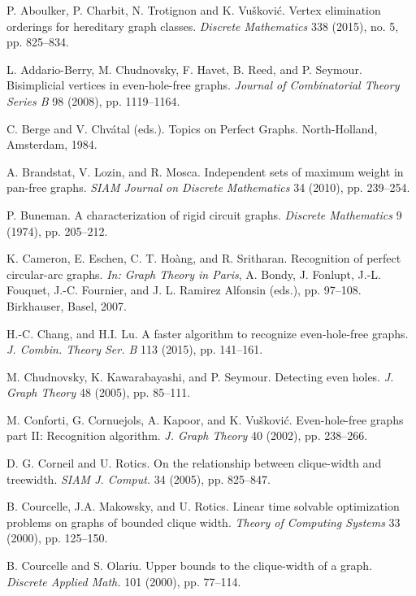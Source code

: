 \documentclass[11pt,a4paper]{article}
\begin{document}

\begin{thebibliography}{99}

P. Aboulker, P. Charbit, N. Trotignon and K. Vu\v{s}kovi\'c.
Vertex elimination orderings for hereditary graph classes.
{\it Discrete Mathematics} 338 (2015), no. 5, pp. 825--834.

L. Addario-Berry, M. Chudnovsky, F. Havet, B. Reed, and P.
Seymour. Bisimplicial vertices in even-hole-free graphs. {\it
Journal of Combinatorial Theory Series B} 98 (2008), pp.
1119--1164.

C. Berge and V. Chv\'{a}tal (eds.).
Topics on Perfect Graphs.
North-Holland, Amsterdam, 1984.

A. Brandstat, V. Lozin,  and R. Mosca. Independent sets of
maximum weight in pan-free graphs. {\it SIAM Journal on Discrete
Mathematics} 34 (2010),  pp. 239--254.

P. Buneman. A characterization of rigid circuit graphs. {\it
Discrete Mathematics} 9 (1974), pp. 205--212.


K. Cameron, E. Eschen, C. T. Ho\`ang, and R. Sritharan.
Recognition of perfect circular-arc graphs.
{\it In: Graph Theory in Paris},
A. Bondy, J. Fonlupt, J.-L. Fouquet, J.-C. Fournier, and J. L. Ramirez Alfonsin (eds.),
pp. 97--108. Birkhauser, Basel, 2007.

H.-C. Chang, and H.I. Lu.
A faster algorithm to recognize even-hole-free graphs.
{\it J. Combin. Theory Ser. B} 113
(2015), pp. 141--161.

M. Chudnovsky, K. Kawarabayashi, and  P. Seymour. Detecting even
holes. {\it J. Graph Theory} 48 (2005), pp. 85--111.

M. Conforti, G. Cornuejols, A. Kapoor, and   K. Vu\v{s}kovi\'c.
Even-hole-free graphs part II: Recognition algorithm. {\it J.
Graph Theory} 40 (2002), pp. 238--266.

D. G. Corneil and U. Rotics. On the relationship between
clique-width and treewidth. {\it SIAM J. Comput.} 34 (2005), pp.
825--847.

B. Courcelle, J.A. Makowsky, and U. Rotics. Linear time solvable
optimization problems on graphs of bounded clique width. {\it
Theory of Computing Systems} 33 (2000), pp. 125--150.

B. Courcelle and S. Olariu. Upper bounds to the clique-width of a
graph. {\it Discrete Applied Math.} 101 (2000), pp. 77--114.


\end{thebibliography}
\end{document}
